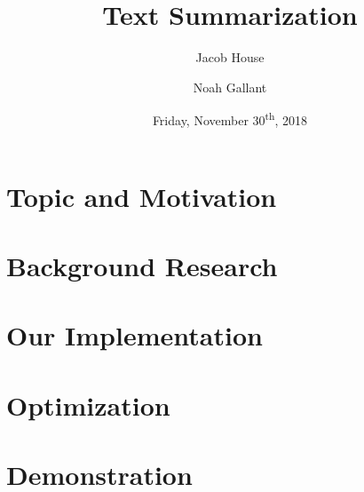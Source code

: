 \documentclass[12pt]{article}
\title{Text Summarization}
\author{Jacob House \and Noah Gallant}
\date{Friday, November 30\textsuperscript{th}, 2018}
\begin{document}
	\maketitle
	\tableofcontents 
	
	\section{Topic and Motivation}
	
	
	\section{Background Research}
	
	
	\section{Our Implementation}
	
	
	\section{Optimization}
	
	
	\printbibliography
	\appendix
	\section{Demonstration}
	
	
\end{document}
